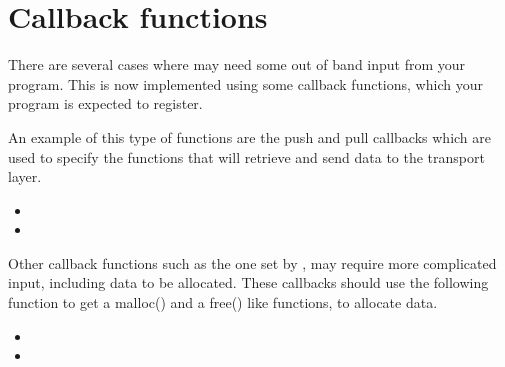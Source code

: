 \section{Callback functions}

There are several cases where \gnutls{} may need some out of band input from
your program. This is now implemented using some callback functions,
which your program is expected to register.

An example of this type of functions are the push and pull callbacks
which are used to specify the functions that will retrieve and send
data to the transport layer.
\begin{itemize}
\item {}
\item {}
\end{itemize}

Other callback functions such as the one set by
,
may require more complicated input, including data to be allocated.
These callbacks should use the following function to get a malloc()
and a free() like functions, to allocate data.
\begin{itemize}
\item {}
\item {}
\end{itemize}
